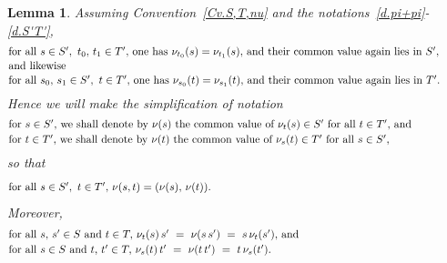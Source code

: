 \documentclass{amsart}
\newtheorem{lemma}[theorem]{Lemma}
\numberwithin{equation}{section}
\numberwithin{theorem}{section}
\begin{document}
\begin{lemma}\label{L.split_nu}
Assuming Convention~\ref{Cv.S,T,nu} and the
notations~\eqref{d.pi+pi}-\eqref{d.S'T'},
%
\begin{equation}\begin{minipage}[c]{35pc}\label{d.nu_t1=nu_t2}
for all $s\in S',~t_0,\,t_1\in T',$ one has
$\nu_{t_0}(s) = \nu_{t_1}(s),$
and their common value again lies in $S',$\\[.1em]
and likewise\\[.1em]
for all $s_0,\,s_1\in S',~t\in T',$ one has
$\nu_{s_0}(t) = \nu_{s_1}(t),$
and their common value again lies in $T'.$
\end{minipage}\end{equation}
%
Hence we will make the simplification of notation
%
\begin{equation}\begin{minipage}[c]{35pc}\label{d.nu(s)=nu_t(s)}
for $s\in S',$ we shall denote by $\nu(s)$ the common value
of $\nu_t(s)\in S'$ for all $t\in T',$ and\\[.2em]
for $t\in T',$ we shall denote by $\nu(t)$ the common value
of $\nu_s(t)\in T'$ for all $s\in S',$
\end{minipage}\end{equation}
%
so that
%
\begin{equation}\begin{minipage}[c]{35pc}\label{d.(nu(s),nu(t))}
for all $s\in S',~t\in T',$ $\nu(s,t) = (\nu(s),\,\nu(t)).$
\end{minipage}\end{equation}
%
Moreover,
%
\begin{equation}\begin{minipage}[c]{35pc}\label{d.nu_t(s)s'}
for all $s,\,s'\in S$ and $t\in T,$
$\nu_t(s)\,s'~=~\nu(s\,s')~=~s\,\nu_t(s'),$ and\\[.2em]
for all $s \in S$ and $t,\,t'\in T,$
$\nu_s(t)\,t'~=~\nu(t\,t')~=~t\,\nu_s(t').$
\end{minipage}\end{equation}
%
\end{lemma}
\end{document}
